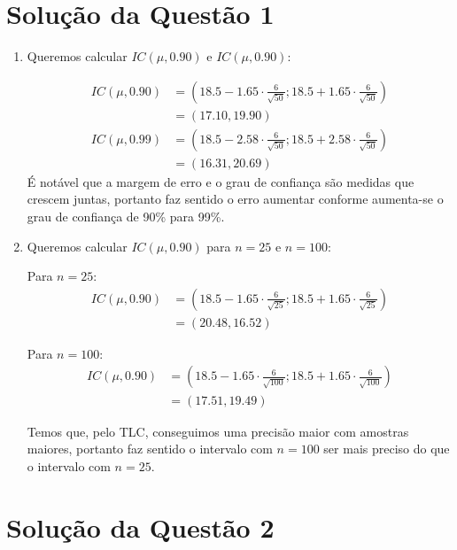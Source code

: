 \documentclass[
	12pt,				%
	openright,			%
	oneside,			%
	a4paper,			%
	english,			%
	brazil,				%
	]{abntex2}
\begin{document}
\imprimircapa
\textual

\section{Solução da Questão 1}
\begin{enumerate}[label=\alph*)]
    \item Queremos calcular $IC(\mu, 0.90)$ e $IC(\mu, 0.90)$:
    
    \begin{align*}
        IC(\mu, 0.90) &= \left(18.5 - 1.65 \cdot \frac{6}{\sqrt{50}};18.5 + 1.65 \cdot \frac{6}{\sqrt{50}}\right)\\
        &= (17.10, 19.90)\\
        IC(\mu, 0.99) &= \left(18.5 - 2.58 \cdot \frac{6}{\sqrt{50}};18.5 + 2.58 \cdot \frac{6}{\sqrt{50}}\right)\\
        &= (16.31, 20.69)
    \end{align*}
    É notável que a margem de erro e o grau de confiança são medidas que crescem juntas,  portanto faz sentido o erro aumentar conforme aumenta-se o grau de confiança de 90\% para 99\%.
    
    \item Queremos calcular $IC(\mu, 0.90)$ para $n = 25$ e $n = 100$:
    
    Para $n = 25$:
    \begin{align*}
        IC(\mu, 0.90) &= \left(18.5 - 1.65 \cdot \frac{6}{\sqrt{25}};18.5 + 1.65 \cdot \frac{6}{\sqrt{25}}\right)\\
        &= (20.48, 16.52)
    \end{align*}
    
    Para $n = 100$:
    \begin{align*}
        IC(\mu, 0.90) &= \left(18.5 - 1.65 \cdot \frac{6}{\sqrt{100}};18.5 + 1.65 \cdot \frac{6}{\sqrt{100}}\right)\\
        &= (17.51, 19.49)
    \end{align*}
    
    Temos que, pelo TLC, conseguimos uma precisão maior com amostras maiores, portanto faz sentido o intervalo com $n = 100$ ser mais preciso do que o intervalo com $n = 25$.

\end{enumerate}

\section{Solução da Questão 2}
\end{document}
